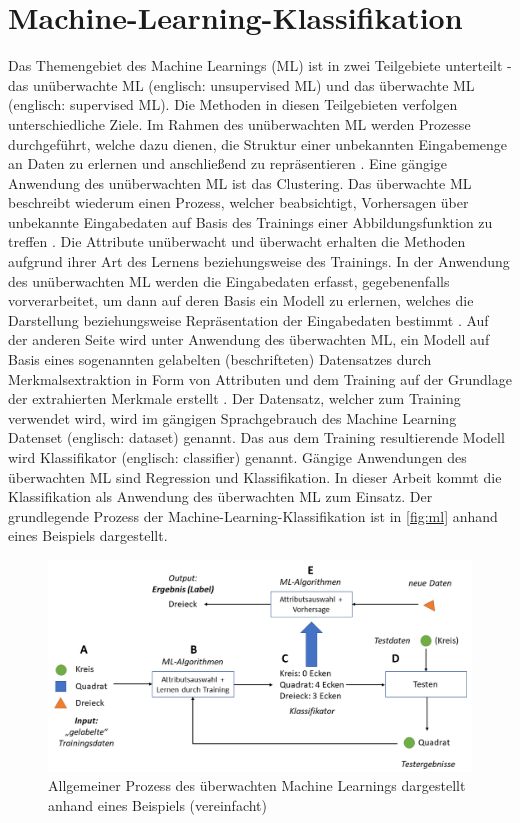 \section{Machine-Learning-Klassifikation}
\label{classification}

Das Themengebiet des Machine Learnings (ML) ist in zwei Teilgebiete unterteilt - das unüberwachte ML (englisch: unsupervised ML) und das überwachte ML (englisch: supervised ML). Die Methoden in diesen Teilgebieten verfolgen unterschiedliche Ziele. Im Rahmen des unüberwachten ML werden Prozesse durchgeführt, welche dazu dienen, die Struktur einer unbekannten Eingabemenge an Daten zu erlernen und anschließend zu repräsentieren \cite{Sammut2017}. Eine gängige Anwendung des unüberwachten ML ist das Clustering. Das überwachte ML beschreibt wiederum einen Prozess, welcher beabsichtigt, Vorhersagen über unbekannte Eingabedaten auf Basis des Trainings einer Abbildungsfunktion zu treffen \cite{Sammut2017}. Die Attribute \glqq unüberwacht\grqq{} und \glqq überwacht\grqq{} erhalten die Methoden aufgrund ihrer Art des Lernens beziehungsweise des Trainings. In der Anwendung des unüberwachten ML werden die Eingabedaten erfasst, gegebenenfalls vorverarbeitet, um dann auf deren Basis ein Modell zu erlernen, welches die Darstellung beziehungsweise Repräsentation der Eingabedaten bestimmt \cite{Alpaydin2010}. Auf der anderen Seite wird unter Anwendung des überwachten ML, ein Modell auf Basis eines sogenannten \glqq gelabelten\grqq{} (beschrifteten) Datensatzes durch Merkmalsextraktion in Form von Attributen und dem Training auf der Grundlage der extrahierten Merkmale erstellt \cite{Alpaydin2010}. Der Datensatz, welcher zum Training verwendet wird, wird im gängigen Sprachgebrauch des Machine Learning Datenset (englisch: dataset) genannt. Das aus dem Training resultierende Modell wird Klassifikator (englisch: classifier) genannt. Gängige Anwendungen des überwachten ML sind Regression und Klassifikation. In dieser Arbeit kommt die Klassifikation als Anwendung des überwachten ML zum Einsatz. Der grundlegende Prozess der Machine-Learning-Klassifikation ist in \autoref{fig:ml} anhand eines Beispiels dargestellt.

\begin{figure}[ht]
    \centering
    \captionsetup{justification=centering,margin=2cm}
    \includegraphics[width=\textwidth]{images/ML}
    \caption{Allgemeiner Prozess des überwachten Machine Learnings dargestellt anhand eines Beispiels (vereinfacht)}\label{fig:ml}
\end{figure}

